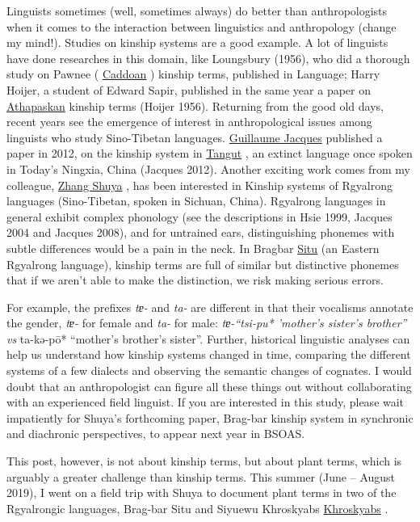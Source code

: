 \documentclass[
  a4paper,
  14pt,
  oneside,
  tablecaptionabove
]{scrbook}
\begin{document}
Linguists sometimes (well, sometimes always) do better than
anthropologists when it comes to the interaction between linguistics and
anthropology (change my mind!). Studies on kinship systems are a good
example. A lot of linguists have done researches in this domain, like
Loungsbury (1956), who did a thorough study on Pawnee (
\href{https://glottolog.org/resource/languoid/id/pawn1254}{Caddoan} )
kinship terms, published in Language; Harry Hoijer, a student of Edward
Sapir, published in the same year a paper on
\href{https://glottolog.org/resource/languoid/id/atha1247}{Athapaskan}
kinship terms (Hoijer 1956). Returning from the good old days, recent
years see the emergence of interest in anthropological issues among
linguists who study Sino-Tibetan languages.
\href{https://panchr.hypotheses.org}{Guillaume Jacques} published a
paper in 2012, on the kinship system in
\href{https://glottolog.org/resource/languoid/id/tang1334}{Tangut} , an
extinct language once spoken in Today's Ningxia, China (Jacques 2012).
Another exciting work comes from my colleague,
\href{https://inalco.academia.edu/zhangshuya}{Zhang Shuya} , has been
interested in Kinship systems of Rgyalrong languages (Sino-Tibetan,
spoken in Sichuan, China). Rgyalrong languages in general exhibit
complex phonology (see the descriptions in Hsie 1999, Jacques 2004 and
Jacques 2008), and for untrained ears, distinguishing phonemes with
subtle differences would be a pain in the neck. In Bragbar
\href{https://glottolog.org/resource/languoid/id/situ1238}{Situ} (an
Eastern Rgyalrong language), kinship terms are full of similar but
distinctive phonemes that if we aren't able to make the distinction, we
risk making serious errors.

For example, the prefixes \emph{tɐ-} and \emph{ta-} are different in
that their vocalisms annotate the gender, \emph{tɐ-} for female and
\emph{ta-} for male: \emph{tɐ-\enquote{tsi-pu* 'mother's sister's
brother} vs }ta-kə-pō* \enquote{mother's brother's sister}. Further,
historical linguistic analyses can help us understand how kinship
systems changed in time, comparing the different systems of a few
dialects and observing the semantic changes of cognates. I would doubt
that an anthropologist can figure all these things out without
collaborating with an experienced field linguist. If you are interested
in this study, please wait impatiently for Shuya's forthcoming paper,
Brag-bar kinship system in synchronic and diachronic perspectives, to
appear next year in BSOAS.

This post, however, is not about kinship terms, but about plant terms,
which is arguably a greater challenge than kinship terms. This summer
(June -- August 2019), I went on a field trip with Shuya to document
plant terms in two of the Rgyalrongic languages, Brag-bar Situ and
Siyuewu Khroskyabs
\href{https://glottolog.org/resource/languoid/id/siya1242}{Khroskyabs} .
\end{document}
